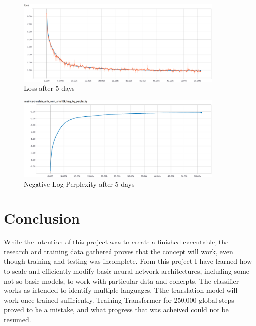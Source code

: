 \documentclass[10pt,a4paper]{article}
\begin{document}
\begin{figure}[H]
  \begin{center}
    \includegraphics[width=0.9\textwidth] {loss.png}
    \caption{Loss after 5 days}
  \end{center}
\end{figure}


\begin{figure}[H]
  \begin{center}
    \includegraphics[width=0.9\textwidth] {neg_log_perp.png}
    \caption{Negative Log Perplexity after 5 days}
  \end{center}
\end{figure}


\section{Conclusion}


While the intention of this project was to create a finished executable, the research and training data gathered proves that the concept will work, even though training and testing was incomplete. From this project I have learned how to scale and efficiently modify basic neural network architectures, including some not so basic models, to work with particular data and concepts. The classifier works as intended to identify multiple languages. Tthe translation model will work once trained sufficiently. Training Transformer for 250,000 global steps proved to be a mistake, and what progress that was acheived could not be resumed.
\end{document}
